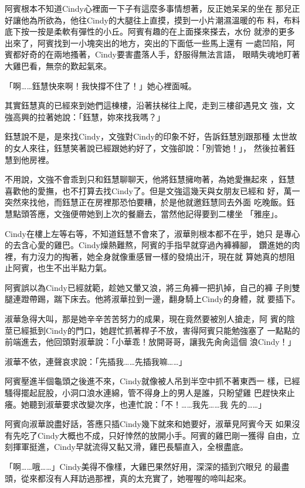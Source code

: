 阿賓根本不知道Cindy心裡面一下子有這麼多事情想著，反正她呆呆的坐在
那兒正好讓他為所欲為，他往Cindy的大腿往上直摸，摸到一小片潮濕溫暖的布
料，布料底下按一按是柔軟有彈性的小丘。阿賓有趣的在上面搽來搽去，水份
就滲的更多出來了，阿賓找到一小塊突出的地方，突出的下面低一些馬上還有
一處凹陷，阿賓都好奇的在兩地搔著，Cindy要害盡落人手，舒服得無法言語，
眼睛失魂地盯著大雞巴看，無奈的歎起氣來。

「啊……鈺慧快來啊！我快撐不住了！」她心裡面喊。

其實鈺慧真的已經來到她們這棟樓，沿著扶梯往上爬，走到三樓卻遇見文
強，文強高興的拉著她說：「鈺慧，妳來找我嗎？」

鈺慧說不是，是來找Cindy，文強對Cindy的印象不好，告訴鈺慧別跟那種
太世故的女人來往，鈺慧笑著說已經跟她約好了，文強卻說：「別管她！」，
然後拉著鈺慧到他房裡。

不用說，文強不會乖到只和鈺慧聊聊天，他將鈺慧擁吻著，為她愛撫起來
，鈺慧喜歡他的愛撫，也不打算去找Cindy了。但是文強這幾天與女朋友已經和
好，萬一突然來找他，而鈺慧正在房裡那恐怕要糟，於是他就邀鈺慧同去外面
吃晚飯。鈺慧點頭答應，文強便帶她到上次的餐廳去，當然他記得要到二樓坐
「雅座」。

Cindy在樓上左等右等，不知道鈺慧不會來了，淑華則根本都不在乎，她只
是專心的去含心愛的雞巴。Cindy燥熱難熬，阿賓的手指早就穿過內褲褲腳，
鑽進她的肉裡，有力沒力的掏著，她全身就像重感冒一樣的發燒出汗，現在就
算她真的想阻止阿賓，也生不出半點力氣。

阿賓誤以為Cindy已經就範，趁她又暈又浪，將三角褲一把扒掉，自己的褲
子則雙腿連蹬帶踢，踹下床去。他將淑華拉到一邊，翻身騎上Cindy的身體，就
要插下。

淑華急得大叫，那是她辛辛苦苦努力的成果，現在竟然要被別人搶走，阿
賓的陰莖已經抵到Cindy的門口，她趕忙抓著桿子不放，害得阿賓只能勉強塞了
一點點的前端進去，他回頭對淑華說：「小華乖！放開哥哥，讓我先肏肏這個
浪Cindy！」

淑華不依，連聲哀求說：「先插我……先插我嘛……」

阿賓壓進半個龜頭之後進不來，Cindy就像被人吊到半空中抓不著東西一
樣，已經騷得擺起屁股，小洞口浪水連綿，管不得身上的男人是誰，只盼望雞
巴趕快來止癢。她聽到淑華要求改變次序，也連忙說：「不！……我先……我
先的……」

阿賓向淑華說盡好話，答應只插Cindy幾下就來和她要好，淑華見阿賓今天
如果沒有先吃了Cindy大概也不成，只好悻然的放開小手。阿賓的雞巴剛一獲得
自由，立刻揮軍挺進，Cindy早就流得又黏又滑，雞巴長驅直入，全根盡底。

「啊……哦……」Cindy美得不像樣，大雞巴果然好用，深深的插到穴眼兒
的最盡頭，從來都沒有人拜訪過那裡，真的太充實了，她喔喔的啼叫起來。

